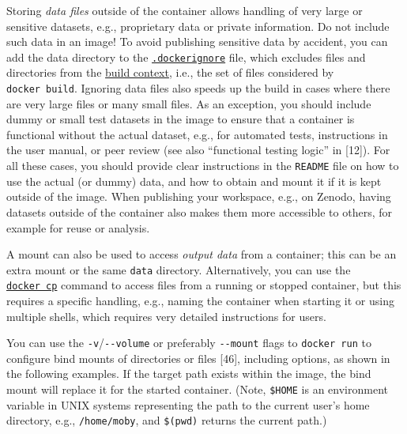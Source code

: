 \documentclass[10pt,letterpaper]{article}
\begin{document}
Storing \emph{data files} outside of the container allows handling of
very large or sensitive datasets, e.g., proprietary data or private
information. Do not include such data in an image! To avoid publishing
sensitive data by accident, you can add the data directory to the
\href{https://docs.docker.com/engine/reference/commandline/build/\#use-a-dockerignore-file}{\texttt{.dockerignore}}
file, which excludes files and directories from the
\href{https://docs.docker.com/engine/reference/commandline/build/\#extended-description}{build
context}, i.e., the set of files considered by \texttt{docker\ build}.
Ignoring data files also speeds up the build in cases where there are
very large files or many small files. As an exception, you should
include dummy or small test datasets in the image to ensure that a
container is functional without the actual dataset, e.g., for automated
tests, instructions in the user manual, or peer review (see also
``functional testing logic'' in {[}12{]}). For all these cases, you
should provide clear instructions in the \texttt{README} file on how to
use the actual (or dummy) data, and how to obtain and mount it if it is
kept outside of the image. When publishing your workspace, e.g., on
Zenodo, having datasets outside of the container also makes them more
accessible to others, for example for reuse or analysis.

A mount can also be used to access \emph{output data} from a container;
this can be an extra mount or the same \texttt{data} directory.
Alternatively, you can use the
\href{https://docs.docker.com/engine/reference/commandline/cp/}{\texttt{docker\ cp}}
command to access files from a running or stopped container, but this
requires a specific handling, e.g., naming the container when starting
it or using multiple shells, which requires very detailed instructions
for users.

You can use the \texttt{-v}/\texttt{-\/-volume} or preferably
\texttt{-\/-mount} flags to \texttt{docker\ run} to configure bind
mounts of directories or files {[}46{]}, including options, as shown in
the following examples. If the target path exists within the image, the
bind mount will replace it for the started container. (Note,
\texttt{\$HOME} is an environment variable in UNIX systems representing
the path to the current user's home directory, e.g.,
\texttt{/home/moby}, and \texttt{\$(pwd)} returns the current path.)

\footnotesize
\end{document}
